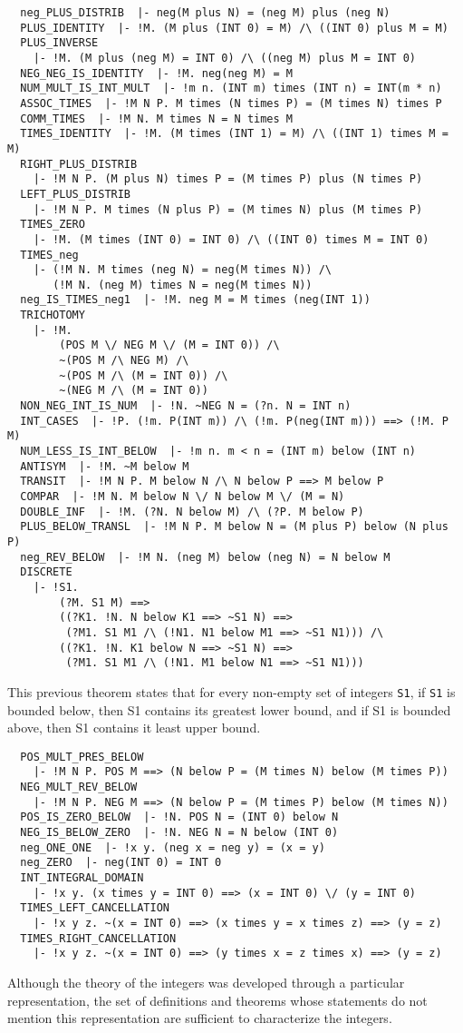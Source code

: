 \begin{verbatim}
  neg_PLUS_DISTRIB  |- neg(M plus N) = (neg M) plus (neg N)
  PLUS_IDENTITY  |- !M. (M plus (INT 0) = M) /\ ((INT 0) plus M = M)
  PLUS_INVERSE
    |- !M. (M plus (neg M) = INT 0) /\ ((neg M) plus M = INT 0)
  NEG_NEG_IS_IDENTITY  |- !M. neg(neg M) = M
  NUM_MULT_IS_INT_MULT  |- !m n. (INT m) times (INT n) = INT(m * n)
  ASSOC_TIMES  |- !M N P. M times (N times P) = (M times N) times P
  COMM_TIMES  |- !M N. M times N = N times M
  TIMES_IDENTITY  |- !M. (M times (INT 1) = M) /\ ((INT 1) times M = M)
  RIGHT_PLUS_DISTRIB
    |- !M N P. (M plus N) times P = (M times P) plus (N times P)
  LEFT_PLUS_DISTRIB
    |- !M N P. M times (N plus P) = (M times N) plus (M times P)
  TIMES_ZERO
    |- !M. (M times (INT 0) = INT 0) /\ ((INT 0) times M = INT 0)
  TIMES_neg
    |- (!M N. M times (neg N) = neg(M times N)) /\
       (!M N. (neg M) times N = neg(M times N))
  neg_IS_TIMES_neg1  |- !M. neg M = M times (neg(INT 1))
  TRICHOTOMY
    |- !M.
        (POS M \/ NEG M \/ (M = INT 0)) /\
        ~(POS M /\ NEG M) /\
        ~(POS M /\ (M = INT 0)) /\
        ~(NEG M /\ (M = INT 0))
  NON_NEG_INT_IS_NUM  |- !N. ~NEG N = (?n. N = INT n)
  INT_CASES  |- !P. (!m. P(INT m)) /\ (!m. P(neg(INT m))) ==> (!M. P M)
  NUM_LESS_IS_INT_BELOW  |- !m n. m < n = (INT m) below (INT n)
  ANTISYM  |- !M. ~M below M
  TRANSIT  |- !M N P. M below N /\ N below P ==> M below P
  COMPAR  |- !M N. M below N \/ N below M \/ (M = N)
  DOUBLE_INF  |- !M. (?N. N below M) /\ (?P. M below P)
  PLUS_BELOW_TRANSL  |- !M N P. M below N = (M plus P) below (N plus P)
  neg_REV_BELOW  |- !M N. (neg M) below (neg N) = N below M
  DISCRETE
    |- !S1.
        (?M. S1 M) ==>
        ((?K1. !N. N below K1 ==> ~S1 N) ==>
         (?M1. S1 M1 /\ (!N1. N1 below M1 ==> ~S1 N1))) /\
        ((?K1. !N. K1 below N ==> ~S1 N) ==>
         (?M1. S1 M1 /\ (!N1. M1 below N1 ==> ~S1 N1)))
\end{verbatim}
This previous theorem states that for every non-empty set of integers
{\tt S1}, if {\tt S1} is bounded below, then S1 contains its greatest
lower bound, and if S1 is bounded above, then S1 contains it least
upper bound.
\begin{verbatim}
  POS_MULT_PRES_BELOW
    |- !M N P. POS M ==> (N below P = (M times N) below (M times P))
  NEG_MULT_REV_BELOW
    |- !M N P. NEG M ==> (N below P = (M times P) below (M times N))
  POS_IS_ZERO_BELOW  |- !N. POS N = (INT 0) below N
  NEG_IS_BELOW_ZERO  |- !N. NEG N = N below (INT 0)
  neg_ONE_ONE  |- !x y. (neg x = neg y) = (x = y)
  neg_ZERO  |- neg(INT 0) = INT 0
  INT_INTEGRAL_DOMAIN
    |- !x y. (x times y = INT 0) ==> (x = INT 0) \/ (y = INT 0)
  TIMES_LEFT_CANCELLATION
    |- !x y z. ~(x = INT 0) ==> (x times y = x times z) ==> (y = z)
  TIMES_RIGHT_CANCELLATION
    |- !x y z. ~(x = INT 0) ==> (y times x = z times x) ==> (y = z)
\end{verbatim}

Although the theory of the integers was developed through a particular
representation, the set of definitions and theorems whose statements
do not mention this representation are sufficient to characterize the
integers.
